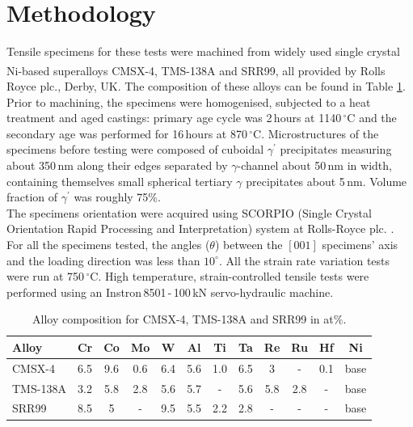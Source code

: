 \documentclass[a4paper,12pt,times,numbered,print,index]{Classes/PhDThesisPSnPDF}
\begin{document}
\section*{Methodology}
Tensile specimens for these tests were machined from widely used single crystal Ni-based superalloys CMSX-4\textsuperscript{\textregistered}, TMS-138A and SRR99, all provided by Rolls Royce plc., Derby, UK. The composition of these alloys can be found in Table \ref{tab:comp}. Prior to machining, the specimens were homogenised, subjected to a heat treatment and aged castings: primary age cycle was 2\,hours at 1140\,$^\circ{}$C and the secondary age was performed for 16\,hours at 870\,$^\circ{}$C. Microstructures of the specimens before testing were composed of cuboidal $\gamma^\prime$ precipitates measuring about 350\,nm along their edges separated by $\gamma$-channel about 50\,nm in width, containing themselves small spherical tertiary $\gamma$ precipitates about 5\,nm. Volume fraction of $\gamma^\prime$ was roughly 75\%.\\The specimens orientation were acquired using SCORPIO (Single Crystal Orientation Rapid Processing and Interpretation) system at Rolls-Royce plc. \cite{jones1995rolls,smith1999industrial}. For all the specimens tested, the angles ($\theta$) between the $[001]$ specimens' axis and the loading direction was less than $10^\circ$. All the strain rate variation tests were run at 750\,$^\circ$C. High temperature, strain-controlled tensile tests were performed using an Instron\,8501\,-\,100\,kN servo-hydraulic machine.

\begin{table}[b]
	\caption{Alloy composition for CMSX-4, TMS-138A and SRR99 in at\%. \label{tab:comp}}
	\centering
	\begin{tabular}{l | ccccccccccc}
	\rowcolor[HTML]{C0C0C0}
\hline
Alloy & Cr & Co & Mo & W & Al & Ti & Ta & Re & Ru & Hf & Ni\\
\hline \hline
CMSX-4 & 6.5 & 9.6 & 0.6 & 6.4 & 5.6 & 1.0 & 6.5 & 3 & - & 0.1 & base \\ \hline
TMS-138A & 3.2 & 5.8 & 2.8 & 5.6 & 5.7 & - & 5.6 & 5.8 & 2.8 & - & base\\ \hline
    SRR99 & 8.5 & 5 & - & 9.5 & 5.5 & 2.2 & 2.8 & - & - & - & base\\ \hline
	\end{tabular}
\end{table}
\end{document}
